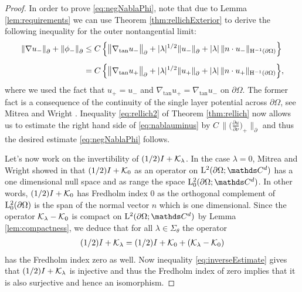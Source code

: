 \begin{proof}
  In order to prove \eqref{eq:negNablaPhi}, note that due to Lemma \ref{lem:requirements} we can use Theorem \ref{thm:rellichExterior} to derive the following inequality for the outer nontangential limit:
  \begin{align}
    \|\nabla u_-\|^{}_\partial + \|\phi_-\|^{}_\partial
    &\leq C\, \Big\{ \big\|\nabla_{\mathrm{tan}} u_- \big\|^{}_\partial + |\lambda|^{1/2} \| u_-\|^{}_\partial + |\lambda|\, \| n \cdot u_-\|_{\mathrm{H}^{-1}(\partial\Omega)} \Big\} \nonumber\\[0.5em]
    \label{eq:nablauminus}
    &= C \, \Big\{ \big\|\nabla_{\mathrm{tan}} u_+ \big\|^{}_\partial + |\lambda|^{1/2} \| u_+ \|^{}_\partial + |\lambda|\, \|n \cdot u_+ \|_{\mathrm{H}^{-1}(\partial\Omega)} \Big\},
  \end{align}
  where we used the fact that $u_+ = u_-$ and $\nabla_{\mathrm{tan}} u_+ = \nabla_{\mathrm{tan}} u_-$ on $\partial\Omega$. The former fact is a consequence of the continuity of the single layer potential across $\partial\Omega$, see Mitrea and Wright \cite[Prop. 4.7]{mitreaWright}.
  Inequality \eqref{eq:rellich2} of Theorem \ref{thm:rellich} now allows us to estimate the right hand side of \eqref{eq:nablauminus} by $C \,\|\big(\frac{\partial u}{\partial \nu} \big)_+ \|^{}_\partial$ and thus the desired estimate \eqref{eq:negNablaPhi} follows.

  Let's now work on the invertibility of $(1/2) I + \mathcal{K}_\lambda$. In the case $\lambda = 0$, Mitrea and Wright showed in \cite[Eq. (5.166)]{mitreaWright} that $(1/2) I + \mathcal{K}_0$ as an operator on $\Ell^2(\partial\Omega; \C^d)$ has a one dimensional null space and as range the space $\Ell_0^2(\partial\Omega; \C^d)$.
  In other words, $(1/2) I + \mathcal{K}_0$ has Fredholm index $0$ as the orthogonal complement of $\mathrm{L}^2_0(\partial\Omega)$ is the span of the normal vector $n$ which is one dimensional.
  Since the operator $\mathcal{K}_\lambda - \mathcal{K}_0$ is compact on $\Ell^2(\partial\Omega; \C^d)$ by Lemma \ref{lem:compactness}, we deduce that for all $\lambda \in \Sigma_\theta$ the operator
  \begin{align*}
    (1/2)I + \mathcal{K}_\lambda = (1/2)I + \mathcal{K}_0 + (\mathcal{K}_\lambda - \mathcal{K}_0)
  \end{align*}
  has the Fredholm index zero as well.
  Now inequality \eqref{eq:inverseEstimate} gives that $(1/2)I + \mathcal{K}_\lambda$ is injective and thus the Fredholm index of zero implies that it is also surjective and hence an isomorphism.
\end{proof}

